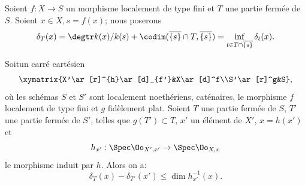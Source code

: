 \subsection{} \label{XIV.2.2} Soient $f:X\to S$ un morphisme localement de type fini et $T$ une partie ferm\'ee de $S$. Soient $x\in X, s=f(x)$; nous poserons
$$
\delta_T(x)=\degtr k(x)/k(s)+\codim(\overline{\{s\}}\cap T, \overline{\{s\}})=\inf_{t\in T\cap\overline{\{s\}}}\delta_t(x).
$$

\begin{sublemme} \label{XIV.2.2.1}
Soit\pageoriginale un carr\'e cart\'esien
$$
\xymatrix{X'\ar[r]^{h}\ar[d]_{f'}&X\ar[d]^f\\S'\ar[r]^g&S},
$$
o\`u les sch\'emas $S$ et $S'$ sont localement noeth\'eriens, cat\'enaires, le morphisme $f$ localement de type fini et $g$ fid\`element plat. Soient $T$ une partie ferm\'ee de $S$, $T'$ une partie ferm\'ee de $S'$, telles que $g(T')\subset T$, $x'$ un \'el\'ement de $X'$, $x=h(x')$ et
$$h_{x'}:\Spec\Oo_{X', x'}\to\Spec\Oo_{X, x}$$
le morphisme induit par $h$. Alors on a:
$$
\delta_T(x)-\delta_{T'}(x')\leq\dim h_{x'}^{-1}(x).
$$
\end{sublemme}


